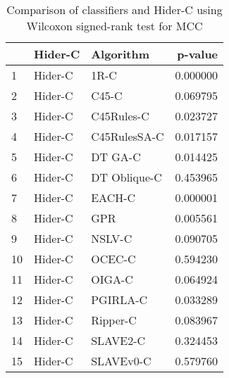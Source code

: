 \begin{table}
\footnotesize
\caption{Comparison of classifiers and Hider-C using Wilcoxon signed-rank test for MCC}
\label{tab:Hider-C wilcoxon MCC comparison}
\begin{tabular}{lllr}
\hline
 & Hider-C & Algorithm & p-value \\
\hline
1 & Hider-C & 1R-C & 0.000000 \\
2 & Hider-C & C45-C & 0.069795 \\
3 & Hider-C & C45Rules-C & 0.023727 \\
4 & Hider-C & C45RulesSA-C & 0.017157 \\
5 & Hider-C & DT GA-C & 0.014425 \\
6 & Hider-C & DT Oblique-C & 0.453965 \\
7 & Hider-C & EACH-C & 0.000001 \\
8 & Hider-C & GPR & 0.005561 \\
9 & Hider-C & NSLV-C & 0.090705 \\
10 & Hider-C & OCEC-C & 0.594230 \\
11 & Hider-C & OIGA-C & 0.064924 \\
12 & Hider-C & PGIRLA-C & 0.033289 \\
13 & Hider-C & Ripper-C & 0.083967 \\
14 & Hider-C & SLAVE2-C & 0.324453 \\
15 & Hider-C & SLAVEv0-C & 0.579760 \\
\hline
\end{tabular}
\end{table}
